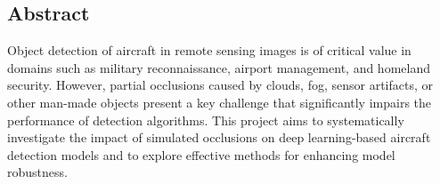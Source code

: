\documentclass[12pt, a4paper]{report}
\begin{document}
\begin{abstract}
\noindent
遥感图像飞机目标检测在军事侦察、机场管理和国土安全等领域具有至关重要的应用价值。然而，在实际应用中，云、雾、传感器伪影或其他人造物造成的部分遮挡是影响检测算法性能的关键挑战。本项目旨在研究模拟遮挡对基于深度学习的飞机目标检测模型的影响，并探索提升模型遮挡鲁棒性的有效方法。

本项目的主要工作包括四个方面：首先，我们基于 DOTA 数据集构建了专用的飞机目标检测数据集，完成了图像切割和旋转框 (OBB) 标注的格式转换；其次，设计并实现了一套可参数化的椭圆高斯光斑生成算法来模拟多样化的遮挡，并提出了"遮挡 OBB 面积百分比 (OOAP)"作为定量评估遮挡程度的指标；接着，我们以 YOLOv8-OBB 为基准模型，通过四组对比实验，系统地评估了模型在清晰及遮挡场景下的性能；最后，开发了一个功能完善的可视化交互式Web应用，用于实时模拟遮挡、对比模型效果和分析检测结果。

核心研究发现表明：模拟遮挡对未经针对性训练的基线模型造成了显著性能退化，其 mAP@0.5 从 0.930 急剧下降至 0.485，召回率从 91\% 降至 34\%，主要表现为大量的目标漏检。通过采用我们提出的遮挡数据增强策略进行训练，新的"遮挡鲁棒模型"在遮挡场景下的性能得到了巨大提升，mAP@0.5 回升至 0.927，几乎与基线模型在清晰场景下的性能持平。同时，我们也观察到，该鲁棒模型在清晰场景下的性能存在一定程度的权衡性下降，这揭示了模型在适应新数据分布时可能存在的性能变化。

本项目的最终成果是一个在遮挡条件下性能优越的飞机目标检测模型，以及一个集成了光斑模拟、模型对比和结果分析功能的可视化应用，为解决遮挡条件下的目标检测问题提供了有效的解决方案和分析工具。

\vspace{1em}
\noindent\textbf{关键词：} 遥感图像、目标检测、旋转框、YOLOv8-OBB、高斯光斑、数据增强、遮挡鲁棒性
\end{abstract}

\newpage

\begin{center}
    \section*{Abstract}
\end{center}
\noindent
Object detection of aircraft in remote sensing images is of critical value in domains such as military reconnaissance, airport management, and homeland security. However, partial occlusions caused by clouds, fog, sensor artifacts, or other man-made objects present a key challenge that significantly impairs the performance of detection algorithms. This project aims to systematically investigate the impact of simulated occlusions on deep learning-based aircraft detection models and to explore effective methods for enhancing model robustness.
\end{document}
